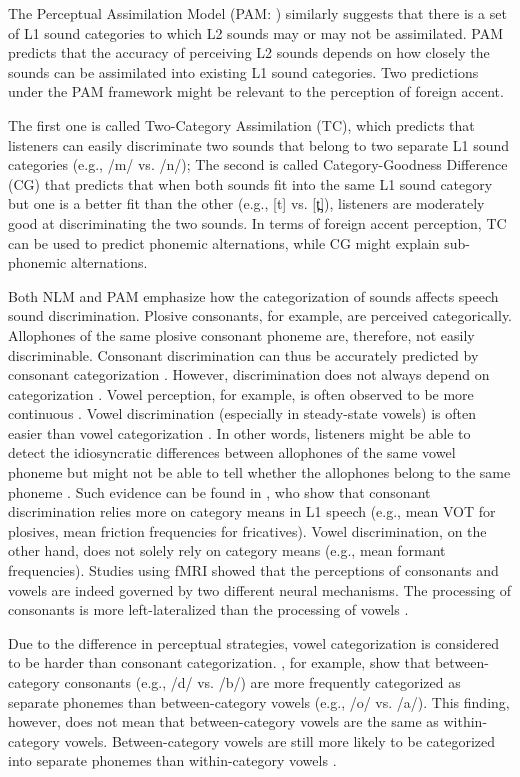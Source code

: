 The Perceptual Assimilation Model (PAM: \citealp{Best_1995}) similarly suggests that there is a set of L1 sound categories to which L2 sounds may or may not be assimilated. PAM predicts that the accuracy of perceiving L2 sounds depends on how closely the sounds can be assimilated into existing L1 sound categories. Two predictions under the PAM framework might be relevant to the perception of foreign accent. 

The first one is called Two-Category Assimilation (TC), which predicts that listeners can easily discriminate two sounds that belong to two separate L1 sound categories (e.g., /m/ vs. /n/); The second is called Category-Goodness Difference (CG) that predicts that when both sounds fit into the same L1 sound category but one is a better fit than the other (e.g., [t] vs. [t̪]), listeners are moderately good at discriminating the two sounds. In terms of foreign accent perception, TC can be used to predict phonemic alternations, while CG might explain sub-phonemic alternations. 

Both NLM and PAM emphasize how the categorization of sounds affects speech sound discrimination. Plosive consonants, for example, are perceived categorically. Allophones of the same plosive consonant phoneme are, therefore, not easily discriminable. Consonant discrimination can thus be accurately predicted by consonant categorization \citep{Liberman_1957, Pisoni_1973}. However, discrimination does not always depend on categorization \citep{Mirman_2004, Repp_1984}. Vowel perception, for example, is often observed to be more continuous \citep{Pisoni_1973}. Vowel discrimination (especially in steady-state vowels) is often easier than vowel categorization \citep{Mirman_2004}. In other words, listeners might be able to detect the idiosyncratic differences between allophones of the same vowel phoneme but might not be able to tell whether the allophones belong to the same phoneme \citep{Mirman_2004}. Such evidence can be found in \citet{Kronrod_2012}, who show that consonant discrimination relies more on category means in L1 speech (e.g., mean VOT for plosives, mean friction frequencies for fricatives). Vowel discrimination, on the other hand, does not solely rely on category means (e.g., mean formant frequencies). Studies using fMRI showed that the perceptions of consonants and vowels are indeed governed by two different neural mechanisms. The processing of consonants is more left-lateralized than the processing of vowels \citep{Altmann_2014}. 

Due to the difference in perceptual strategies, vowel categorization is considered to be harder than consonant categorization. \citet{Altmann_2014}, for example, show that between-category consonants (e.g., /d/ vs. /b/) are more frequently categorized as separate phonemes than between-category vowels (e.g., /o/ vs. /a/). This finding, however, does not mean that between-category vowels are the same as within-category vowels. Between-category vowels are still more likely to be categorized into separate phonemes than within-category vowels \citep{Altmann_2014}.

